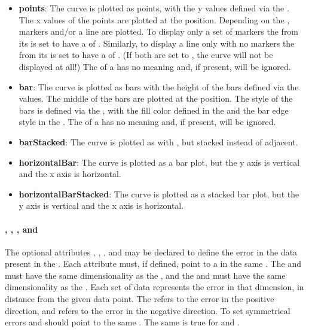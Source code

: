 \begin{blockChanged}
\begin{itemize}
\item \textbf{points}: The curve is plotted as points, with the y values defined via the .  The x values of the points are plotted at the  position.  Depending on the , markers and/or a line are plotted.  To display only a set of markers the \Line from its \Style is set to have a  of .  Similarly, to display a line only with no markers the \Marker from its \Style is set to have a  of .  (If both are set to , the curve will not be displayed at all!)  The \Fill of a \Style has no meaning and, if present, will be ignored.
\item \textbf{bar}: The curve is plotted as bars with the height of the bars defined via the  values.  The middle of the bars are plotted at the  position.  The style of the bars is defined via the , with the fill color defined in the \Fill and the bar edge style in the \Line.  The \Marker of a \Style has no meaning and, if present, will be ignored.
\item \textbf{barStacked}: The curve is plotted as with , but stacked instead of adjacent.
\item \textbf{horizontalBar}: The curve is plotted as a bar plot, but the y axis is vertical and the x axis is horizontal.
\item \textbf{horizontalBarStacked}: The curve is plotted as a stacked bar plot, but the y axis is vertical and the x axis is horizontal.
\end{itemize}

\paragraph*{, , , and }
The optional attributes , , , and  may be declared to define the error in the data present in the \Curve.  Each attribute must, if defined, point to a \DataGenerator in the same \SedDocument.  The  and  must have the same dimensionality as the , and the  and  must have the same dimensionality as the .  Each set of data represents the error in that dimension, in distance from the given data point.  The  refers to the error in the positive direction, and  refers to the error in the negative direction. To set symmetrical errors  and  should point to the same \DataGenerator.  The same is true for  and .



\end{blockChanged}
